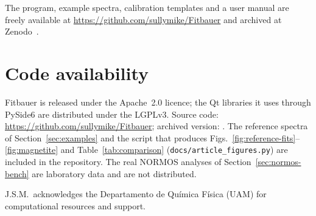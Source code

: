 \documentclass[smallcondensed]{svjour3}
\begin{document}
The program, example spectra, calibration templates and a user manual
are freely available at \url{https://github.com/sullymike/Fitbauer}
and archived at Zenodo~\cite{FitbauerZenodo}.

\section*{Code availability}
Fitbauer is released under the Apache~2.0 licence; the Qt libraries it
uses through PySide6 are distributed under the LGPLv3. Source code:
\url{https://github.com/sullymike/Fitbauer}; archived version:
. The reference spectra of
Section~\ref{sec:examples} and the script that produces Figs.~\ref{fig:reference-fits}--\ref{fig:magnetite} and
Table~\ref{tab:comparison} (\texttt{docs/article\_figures.py}) are
included in the repository. The real NORMOS analyses of
Section~\ref{sec:normos-bench} are laboratory data and are not
distributed.


\begin{acknowledgements}
J.S.M.\ acknowledges the Departamento de Qu\'imica F\'isica (UAM)
for computational resources and support.
\end{acknowledgements}



\end{document}
